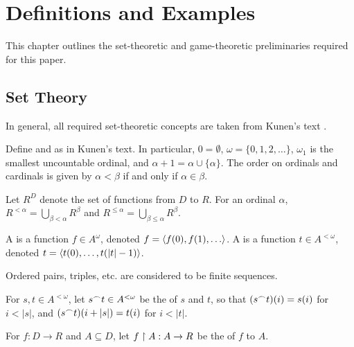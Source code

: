 
\chapter{Definitions and Examples}

This chapter outlines the set-theoretic and game-theoretic preliminaries
required for this paper.

\section{Set Theory}

In general, all required set-theoretic concepts are taken from Kunen's
text \cite{MR597342}.

\begin{defn}
  Define  and  as in Kunen's text.
  In particular, $0=\emptyset$, $\omega=\{0,1,2,\dots\}$,
  $\omega_1$ is the smallest uncountable ordinal, and
  $\alpha+1=\alpha\cup\{\alpha\}$. The order on ordinals and cardinals
  is given by $\alpha<\beta$ if and only if $\alpha\in\beta$.
\end{defn}

\begin{defn}
  Let $R^D$ denote the set of functions from $D$ to $R$. For an ordinal
  $\alpha$, $R^{<\alpha}=\bigcup_{\beta<\alpha}R^\beta$ and
  $R^{\leq\alpha}=\bigcup_{\beta\leq\alpha}R^\beta$.
\end{defn}

\begin{defn}
  A  is a function $f\in A^\omega$, denoted
  $f=\<f(0),f(1),\dots\>$.
  A  is a function
  $t\in A^{<\omega}$, denoted $t=\langle t(0),\dots,t(|t|-1)\rangle$.
\end{defn}

Ordered pairs, triples, etc. are considered to be finite sequences.

\begin{defn}
  For $s,t\in A^{<\omega}$, let $s{^\frown} t\in A^{<\omega}$ be the
   of $s$ and $t$, so that $(s{^\frown} t)(i)=s(i)$
  for $i<|s|$, and $(s{^\frown} t)(i+|s|)=t(i)$ for $i<|t|$.
\end{defn}

\begin{defn}
  For $f:D\to R$ and $A\subseteq D$, let $f\restriction A : A\to R$ be the
   of $f$ to $A$.
\end{defn}


